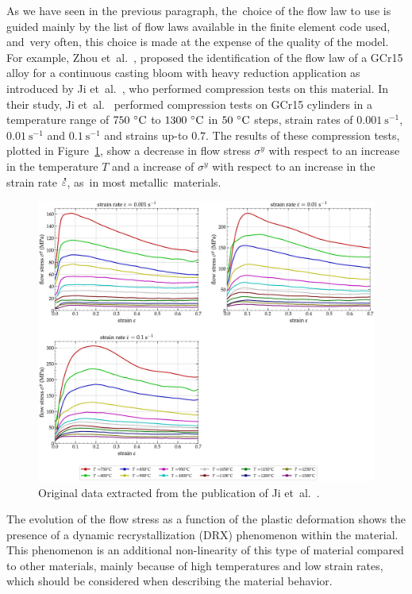 \documentclass[algorithms,article,accept,pdftex,oneauthors]{Definitions/mdpi}
\DeclareRobustCommand{\mdot}[1]{\accentset{\mbox{\bfseries .}}{#1}}
\DeclareRobustCommand{\ps}{\text{s}^{-1}}
\begin{document}
As we have seen in the previous paragraph, the~choice of the flow law to use is guided mainly by the list of flow laws available in the finite element code used, and~very often, this choice is made at the expense of the quality of the model.
For example, Zhou et~al.~\cite{Zhou-2020}, proposed the identification of the flow law of a GCr15 alloy for a continuous casting bloom with heavy reduction application as introduced by Ji et~al.~\cite{Ji-2018}, who performed compression tests on this material.
In their study, Ji et~al.~\cite{Ji-2018} performed compression tests on GCr15 cylinders in a temperature range of $750~\celsius$ to $1300~\celsius$ in $50~\celsius$ steps, strain rates of $0.001~\ps$,  $0.01~\ps$ and $0.1~\ps$ and strains up-to $0.7$.
The results of these compression tests, plotted in Figure~\ref{fig:Zhou-OriginalData}, show a decrease in flow stress $\sigma^y$ with respect to an increase in the temperature $T$ and a increase of $\sigma^y$ with respect to an increase in the strain rate $\mdot\varepsilon$, as~in most metallic~materials.
\begin{figure}[H]
\includegraphics[width=0.9\columnwidth]{Figures/Zhou-OriginalData}
\caption{Original data extracted from the publication of Ji et~al.~\cite{Ji-2018}.}
\label{fig:Zhou-OriginalData}
\end{figure}
The evolution of the flow stress as a function of the plastic deformation shows the presence of a dynamic recrystallization (DRX) phenomenon within the material.
This phenomenon is an additional non-linearity of this type of material compared to other materials, mainly because of high temperatures and low strain rates, which should be considered when describing the material behavior.
\end{document}
